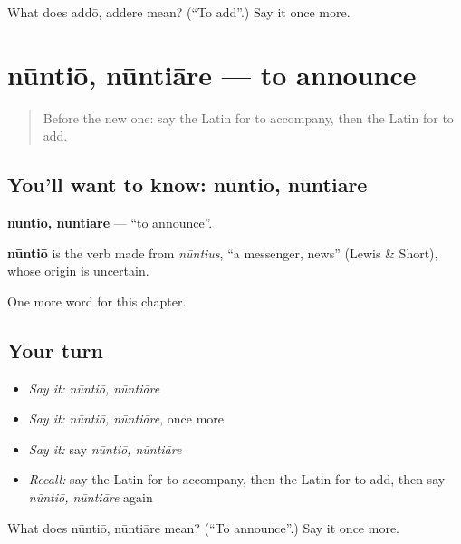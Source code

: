 \begin{tcolorbox}[breakable,colback=teal!4,colframe=teal!35!black,title={Before you move on}]
What does addō, addere mean? (\textquotedblleft{}To add\textquotedblright{}.) Say it once more.
\end{tcolorbox}
\section[nūntiō, nūntiāre]{nūntiō, nūntiāre — to announce}

\label{lesson:LA-C230-nuntio}



\begin{quote}
Before the new one: say the Latin for to accompany, then the Latin for to add.
\end{quote}

\subsection*{You'll want to know: nūntiō, nūntiāre}
\textbf{nūntiō, nūntiāre} — \textquotedblleft{}to announce\textquotedblright{}.

\begin{cousinweb}
\textbf{nūntiō} is the verb made from \emph{nūntius}, \textquotedblleft{}a messenger, news\textquotedblright{} (Lewis \& Short), whose origin is uncertain.
\end{cousinweb}

\begin{grammarlens}[title={What you've built}]
One more word for this chapter.
\end{grammarlens}

\subsection*{Your turn}
\begin{itemize}
\raggedright
  \item \emph{Say it:} \emph{nūntiō, nūntiāre}
  \item \emph{Say it:} \emph{nūntiō, nūntiāre}, once more
  \item \emph{Say it:} say \emph{nūntiō, nūntiāre}
  \item \emph{Recall:} say the Latin for to accompany, then the Latin for to add, then say \emph{nūntiō, nūntiāre} again
\end{itemize}

\begin{tcolorbox}[breakable,colback=teal!4,colframe=teal!35!black,title={Before you move on}]
What does nūntiō, nūntiāre mean? (\textquotedblleft{}To announce\textquotedblright{}.) Say it once more.
\end{tcolorbox}
